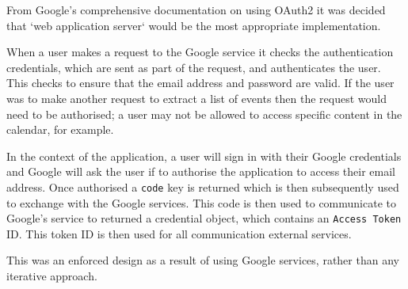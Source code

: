 From Google's comprehensive documentation on using OAuth2 \cite{citeulike:14026287} it was decided that `web application server` would be the most appropriate implementation.

When a user makes a request to the Google service it checks the authentication credentials, which are sent as part of the request, and authenticates the user. This checks to ensure that the email address and password are valid. If the user was to make another request to extract a list of events then the request would need to be authorised; a user may not be allowed to access specific content in the calendar, for example.

In the context of the application, a user will sign in with their Google credentials and Google will ask the user if to authorise the application to access their email address. Once authorised a \texttt{code} key is returned which is then subsequently used to exchange with the Google services. This code is then used to communicate to Google's service to returned a credential object, which contains an \texttt{Access Token} ID. This token ID is then used for all communication external services.

This was an enforced design as a result of using Google services, rather than any iterative approach.

